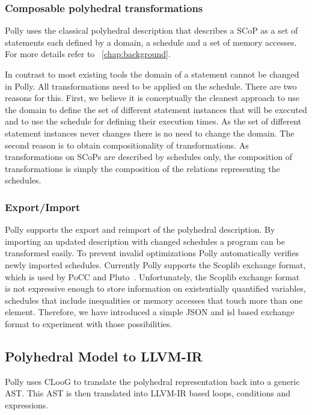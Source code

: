 \subsubsection{Composable polyhedral transformations}
Polly uses the classical polyhedral description \cite{girbal}
that describes a SCoP as a
set of statements each defined by a domain, a schedule and a set of memory
accesses. For more details refer to ~\ref{chap:background}.

In contrast to most existing tools the domain of a statement cannot be changed
in Polly. All transformations need to be applied on the schedule. There
are two reasons for this. First, we believe it is
conceptually the cleanest approach to use the domain to define the set of
different statement instances that will be executed and to use the schedule for
defining their execution times. As the set of different statement instances
never changes there is no need to change the domain. The second reason is to
obtain compositionality of transformations. As transformations on SCoPs are
described by schedules only, the composition of transformations is simply the
composition of the relations representing the schedules.


\subsubsection{Export/Import}

Polly supports the export and reimport of the polyhedral description.  By
importing an updated description with changed schedules a program can be
transformed easily. To prevent invalid optimizations Polly automatically verifies
newly imported schedules. 
Currently Polly supports the Scoplib exchange format, which is used by
PoCC and Pluto~\cite{uday08pldi}.
Unfortunately, the Scoplib exchange format is not expressive enough to store
information on existentially quantified variables, schedules that include
inequalities or memory accesses that touch more than one element. Therefore, we
have introduced a simple JSON\cite{rfc4627} and isl based exchange format to
experiment with those possibilities.

\subsection{Polyhedral Model to LLVM-IR}
Polly uses CLooG \cite{Bas04b} to translate the polyhedral representation back
into a generic AST. This AST is then
translated into LLVM-IR based loops, conditions and expressions.

